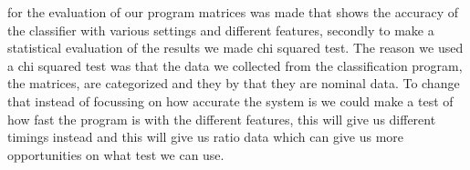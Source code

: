 
for the evaluation of our program matrices was made that shows the accuracy of the classifier with various settings and different features, secondly to make a statistical evaluation of the results we made chi squared test. The reason we used a chi squared test was that the data we collected from the classification program, the matrices, are categorized and they by that they are nominal data. To change that instead of focussing on how accurate the system is we could make a test of how fast the program is with the different features, this will give us different timings instead and this will give us ratio data which can give us more opportunities on what test we can use. 

